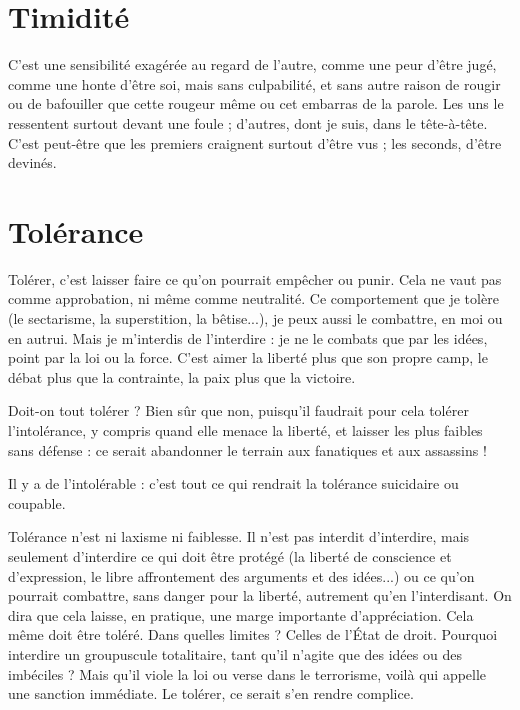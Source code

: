 \section{Timidité}
C’est une sensibilité exagérée au regard de l’autre, comme une
peur d’être jugé, comme une honte d’être soi, mais sans culpabilité,
et sans autre raison de rougir ou de bafouiller que cette rougeur même ou
cet embarras de la parole. Les uns le ressentent surtout devant une foule ;
d’autres, dont je suis, dans le tête-à-tête. C’est peut-être que les premiers craignent
surtout d’être vus ; les seconds, d’être devinés.

\section{Tolérance}
Tolérer, c’est laisser faire ce qu’on pourrait empêcher ou
punir. Cela ne vaut pas comme approbation, ni même
comme neutralité. Ce comportement que je tolère (le sectarisme, la superstition,
la bêtise...), je peux aussi le combattre, en moi ou en autrui. Mais je
m'interdis de l’interdire : je ne le combats que par les idées, point par la loi ou
la force. C’est aimer la liberté plus que son propre camp, le débat plus que la
contrainte, la paix plus que la victoire.

Doit-on tout tolérer ? Bien sûr que non, puisqu'il faudrait pour cela tolérer
l'intolérance, y compris quand elle menace la liberté, et laisser les plus faibles
sans défense : ce serait abandonner le terrain aux fanatiques et aux assassins !

Il y a de l’intolérable : c’est tout ce qui rendrait la tolérance suicidaire ou
coupable.

Tolérance n’est ni laxisme ni faiblesse. Il n’est pas interdit d’interdire, mais
seulement d'interdire ce qui doit être protégé (la liberté de conscience et
d'expression, le libre affrontement des arguments et des idées...) ou ce qu'on
pourrait combattre, sans danger pour la liberté, autrement qu’en l’interdisant.
On dira que cela laisse, en pratique, une marge importante d’appréciation. Cela
même doit être toléré. Dans quelles limites ? Celles de l’État de droit. Pourquoi
interdire un groupuscule totalitaire, tant qu’il n’agite que des idées ou des
imbéciles ? Mais qu’il viole la loi ou verse dans le terrorisme, voilà qui appelle
une sanction immédiate. Le tolérer, ce serait s’en rendre complice.

